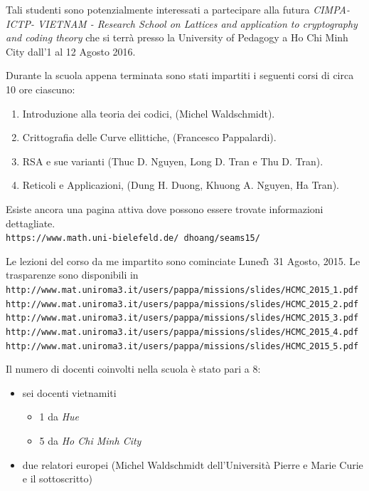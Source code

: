 \documentclass[12pt,a4paper]{letter}
\begin{document}
\begin{letter}
Tali studenti sono potenzialmente interessati  a partecipare alla futura \textit{CIMPA-ICTP-
VIETNAM - Research School on Lattices and application to cryptography and
coding theory} che si terr\`a presso la University of Pedagogy a Ho Chi Minh City dall'1 al 12 Agosto 2016.

Durante la scuola appena terminata sono stati impartiti i seguenti corsi di circa 10 ore ciascuno:
\begin{enumerate}
 \item Introduzione alla teoria dei codici, (Michel Waldschmidt).
 \item Crittografia delle Curve ellittiche, (Francesco Pappalardi).
 \item RSA e sue varianti (Thuc D. Nguyen, Long D. Tran e Thu D. Tran).
 \item  Reticoli e Applicazioni, (Dung H. Duong, Khuong A. Nguyen, Ha Tran).
\end{enumerate}

Esiste ancora una pagina attiva dove possono essere trovate informazioni dettagliate.\\
\small{\texttt{https://www.math.uni-bielefeld.de/~dhoang/seams15/}}

Le lezioni del corso da me impartito sono cominciate Luned\`\i\ 31 Agosto, 2015. Le trasparenze sono disponibili in\\
\hspace*{-.5cm}\small{\texttt{http://www.mat.uniroma3.it/users/pappa/missions/slides/HCMC$\_$2015$\_$1.pdf}}\\
\hspace*{-.5cm}\small{\texttt{http://www.mat.uniroma3.it/users/pappa/missions/slides/HCMC$\_$2015$\_$2.pdf}}\\
\hspace*{-.5cm}\small{\texttt{http://www.mat.uniroma3.it/users/pappa/missions/slides/HCMC$\_$2015$\_$3.pdf}}\\
\hspace*{-.5cm}\small{\texttt{http://www.mat.uniroma3.it/users/pappa/missions/slides/HCMC$\_$2015$\_$4.pdf}}\\
\hspace*{-.5cm}\small{\texttt{http://www.mat.uniroma3.it/users/pappa/missions/slides/HCMC$\_$2015$\_$5.pdf}}

Il numero di docenti coinvolti nella scuola \`e stato pari a 8:
\begin{itemize}
\item sei docenti vietnamiti\vspace*{-2mm}
\begin{itemize} \item 1 da \textit{Hue}\vspace*{-2mm}
\item 5 da \textit{Ho Chi Minh City}\vspace*{-2mm}
\end{itemize}
\item due relatori europei (Michel Waldschmidt dell'Universit\`a Pierre e Marie Curie e il sottoscritto)\vspace*{-2mm}
\end{itemize}


\end{letter}
\end{document}
